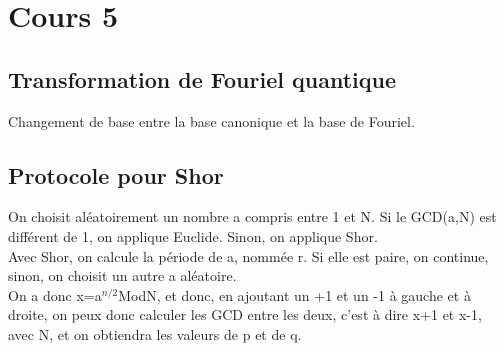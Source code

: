 \section{Cours 5}
\subsection{Transformation de Fouriel quantique}
Changement de base entre la base canonique et la base de Fouriel.
\subsection{Protocole pour Shor}
On choisit aléatoirement un nombre a compris entre 1 et N. Si le GCD(a,N) est différent de 1, on applique Euclide.
Sinon, on applique Shor.\\
Avec Shor, on calcule la période de a, nommée r. Si elle est paire, on continue, sinon, on choisit un autre a
aléatoire.\\
On a donc x=a$^{n/2}$ModN, et donc, en ajoutant un +1 et un -1 à gauche et à droite, on peux donc calculer les GCD entre
les deux, c'est à dire x+1 et x-1, avec N, et on obtiendra les valeurs de p et de q.
